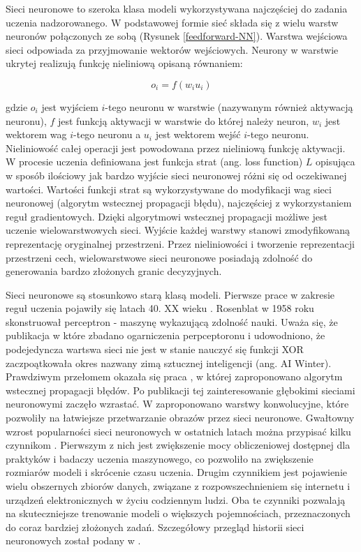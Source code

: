 \documentclass[oneside, mag]{mgr}
\begin{document}
Sieci neuronowe to szeroka klasa modeli wykorzystywana najczęściej do zadania uczenia nadzorowanego. W podstawowej formie sieć składa się z wielu warstw neuronów połączonych ze sobą (Rysunek \ref{feedforward-NN}). Warstwa wejściowa sieci odpowiada za przyjmowanie wektorów wejściowych. Neurony w warstwie ukrytej realizują funkcję nieliniową opisaną równaniem:

\begin{equation}
	o_i = f(w_i u_i)
\end{equation}

gdzie $o_i$ jest wyjściem $i$-tego neuronu w warstwie (nazywanym również aktywacją neuronu), $f$ jest funkcją aktywacji w warstwie do której należy neuron, $w_i$ jest wektorem wag $i$-tego neuronu a $u_i$ jest wektorem wejść $i$-tego neuronu. Nieliniowość całej operacji jest powodowana przez nieliniową funkcję aktywacji. W procesie uczenia definiowana jest funkcja strat (ang. loss function) $L$ opisująca w sposób ilościowy jak bardzo wyjście sieci neuronowej różni się od oczekiwanej wartości. Wartości funkcji strat są wykorzystywane do modyfikacji wag sieci neuronowej (algorytm wstecznej propagacji błędu), najczęściej z wykorzystaniem reguł gradientowych. Dzięki algorytmowi wstecznej propagacji możliwe jest uczenie wielowarstwowych sieci. Wyjście każdej warstwy stanowi zmodyfikowaną reprezentację oryginalnej przestrzeni. Przez nieliniowości i tworzenie reprezentacji przestrzeni cech, wielowarstwowe sieci neuronowe posiadają zdolność do generowania bardzo złożonych granic decyzyjnych.

Sieci neuronowe są stosunkowo starą klasą modeli. Pierwsze prace w zakresie reguł uczenia pojawiły się latach 40. XX wieku \cite{McCulloch-Pitts} \cite{Hebb}. Rosenblat \cite{Rosenblatt} w 1958 roku skonstruował perceptron - maszynę wykazującą zdolność nauki. Uważa się, że publikacja w które zbadano ogarniczenia perpceptoronu i udowodniono, że podejedyncza wartswa sieci nie jest w stanie nauczyć się funkcji XOR \cite{Perceptrons} zaczpoątkowała okres nazwany zimą sztucznej inteligencji (ang. AI Winter). Prawdziwym przełomem okazała się praca \cite{Rumelhart}, w której zaproponowano algorytm wstecznej propagacji błędów. Po publikacji tej zainteresowanie głębokimi sieciami neuronowymi zaczęło wzrastać. W \cite{Conv} zaproponowano warstwy konwolucyjne, które pozwoliły na łatwiejsze przetwarzanie obrazów przez sieci neuronowe. 
Gwałtowny wzrost popularności sieci neuronowych w ostatnich latach można przypisać kilku czynnikom \cite{Goodfellow-et-al-2016}. Pierwszym z nich jest zwiększenie mocy obliczeniowej dostępnej dla praktyków i badaczy uczenia maszynowego, co pozwoliło na zwiększenie rozmiarów modeli i skrócenie czasu uczenia. Drugim czynnikiem jest pojawienie wielu obszernych zbiorów danych, związane z rozpowszechnieniem się internetu i urządzeń elektronicznych w życiu codziennym ludzi. Oba te czynniki pozwalają na skuteczniejsze trenowanie modeli o większych pojemnościach, przeznaczonych do coraz bardziej złożonych zadań. Szczegółowy przegląd historii sieci neuronowych został podany w \cite{DBLP:journals/corr/Schmidhuber14}.
\end{document}
